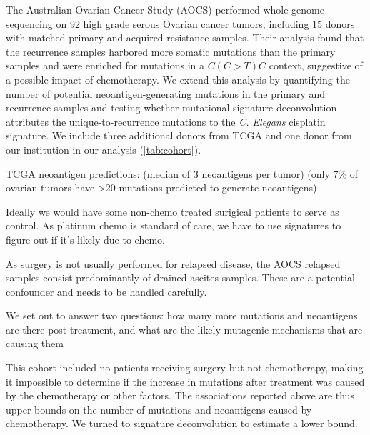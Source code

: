 The Australian Ovarian Cancer Study (AOCS)\cite{Patch_2015} performed whole genome sequencing on 92 high grade serous Ovarian cancer tumors, including 15 donors with matched primary and acquired resistance samples. Their analysis found that the recurrence samples harbored more somatic mutations than the primary samples and were enriched for mutations in a $C(C \gt T)C$ context, suggestive of a possible impact of chemotherapy. We extend this analysis by quantifying the number of potential neoantigen-generating mutations in the primary and recurrence samples and testing whether mutational signature deconvolution attributes the unique-to-recurrence mutations to the \textit{C. Elegans} cisplatin signature. We include three additional donors from TCGA and one donor from our institution in our analysis (\ref{tab:cohort}).

TCGA neoantigen predictions: \cite{Brown_2014} (median of 3 neoantigens per tumor) \cite{Rooney_2015} (only 7\% of ovarian tumors have >20 mutations predicted to generate neoantigens)

Ideally we would have some non-chemo treated surigical patients to serve as control. As platinum chemo is standard of care, we have to use signatures to figure out if it's likely due to chemo.

As surgery is not usually performed for relapsed disease, the AOCS relapsed samples consist predominantly of drained ascites samples. These are a potential confounder and needs to be handled carefully.

We set out to answer two questions: how many more mutations and neoantigens are there post-treatment, and what are the likely mutagenic mechanisms that are causing them

This cohort included no patients receiving surgery but not chemotherapy, making it impossible to determine if the increase in mutations after treatment was caused by the chemotherapy or other factors. The associations reported above are thus upper bounds on the number of mutations and neoantigens caused by chemotherapy. We turned to signature deconvolution to estimate a lower bound.
